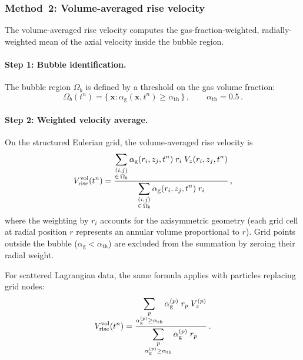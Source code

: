 \documentclass[11pt,a4paper]{article}
\newcommand{\alphag}{\alpha_{\mathrm{g}}}
\newcommand{\Vz}{V_z}
\begin{document}
\subsubsection{Method~2: Volume-averaged rise velocity}
\label{sec:vol_avg}

The volume-averaged rise velocity computes the gas-fraction-weighted,
radially-weighted mean of the axial velocity inside the bubble region.

\paragraph{Step 1: Bubble identification.}
The bubble region $\Omega_b$ is defined by a threshold on the gas volume
fraction:
\begin{equation}\label{eq:bubble_mask}
  \Omega_b(t^n) = \bigl\{\, \bm{x} : \alphag(\bm{x},t^n) \geq
    \alpha_{\mathrm{th}} \,\bigr\}\,,
  \qquad \alpha_{\mathrm{th}} = 0.5\,.
\end{equation}

\paragraph{Step 2: Weighted velocity average.}
On the structured Eulerian grid, the volume-averaged rise velocity is
\begin{equation}\label{eq:vrise_volavg}
  V_{\mathrm{rise}}^{\mathrm{vol}}(t^n)
  = \frac{%
    \displaystyle\sum_{\substack{(i,j) \\ \in\, \Omega_b}}
      \alphag(r_i,z_j,t^n)\; r_i\; \Vz(r_i,z_j,t^n)
  }{%
    \displaystyle\sum_{\substack{(i,j) \\ \in\, \Omega_b}}
      \alphag(r_i,z_j,t^n)\; r_i
  }\,,
\end{equation}
where the weighting by $r_i$ accounts for the axisymmetric geometry (each
grid cell at radial position $r$ represents an annular volume proportional
to $r$).  Grid points outside the bubble ($\alphag < \alpha_{\mathrm{th}}$)
are excluded from the summation by zeroing their radial weight.

For scattered Lagrangian data, the same formula applies with particles
replacing grid nodes:
\begin{equation}\label{eq:vrise_volavg_lag}
  V_{\mathrm{rise}}^{\mathrm{vol}}(t^n)
  = \frac{%
    \displaystyle\sum_{\substack{p \\ \alphag^{(p)}\geq\alpha_{\mathrm{th}}}}
      \alphag^{(p)}\; r_p\; \Vz^{(p)}
  }{%
    \displaystyle\sum_{\substack{p \\ \alphag^{(p)}\geq\alpha_{\mathrm{th}}}}
      \alphag^{(p)}\; r_p
  }\,.
\end{equation}
\end{document}
